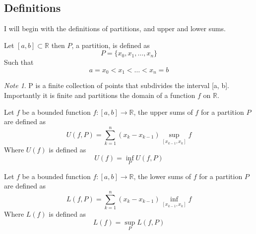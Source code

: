 \documentclass[12pt]{article}
\theoremstyle{plain}
\theoremstyle{definition}
\theoremstyle{definition}
\theoremstyle{remark}
\newtheorem*{remark}{Note}
\begin{document}
\subsection{Definitions}

I will begin with the definitions of partitions, and upper and lower sums.

\begin{definition}[Partition]
    Let $[a, b] \subset \mathbb{R}$ then $P$, a partition, is defined as
    \begin{equation*}
        P = \{x_0, x_1, \ldots, x_n\}
    \end{equation*}
    Such that 
    \begin{equation*}
        a = x_0 < x_1 < \ldots < x_n = b
    \end{equation*}
\end{definition}

\begin{remark}
    P is a finite collection of points that subdivides the interval [a, b]. Importantly
    it is finite and partitions the domain of a function $f$ on $\mathbb{R}$.
\end{remark}

\begin{definition}
    Let $f$ be a bounded function $f \colon [a, b] \to \mathbb{R}$, the upper sums of
    $f$ for a partition $P$ are defined as
    \begin{equation*}
        U(f, P) = \sum_{k=1}^{n} (x_k - x_{k-1}) \sup_{[x_{k-1}, x_k]} f
    \end{equation*}
    Where $U(f)$ is defined as
    \begin{equation*}
        U(f) = \inf_P U(f, P)
    \end{equation*}
\end{definition}


\begin{definition}
    Let $f$ be a bounded function $f \colon [a, b] \to \mathbb{R}$, the lower sums of
    $f$ for a partition $P$ are defined as
    \begin{equation*}
        L(f, P) = \sum_{k=1}^{n} (x_k - x_{k-1}) \inf_{[x_{k-1}, x_k]} f
    \end{equation*}
    Where $L(f)$ is defined as 
    \begin{equation*}
        L(f) = \sup_P L(f, P)
    \end{equation*}
\end{definition}
\end{document}
